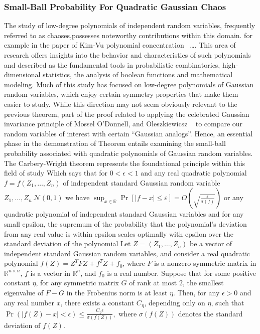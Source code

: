 \subsubsection{Small-Ball Probability For Quadratic Gaussian Chaos} 
The study of low-degree polynomials of independent random variables,
frequently referred to as chaoses,possesses noteworthy contributions within this domain.
for example in the paper of Kim-Vu polynomial concentration
~\cite{kim2000concentration}\dots. 
This area of research offers insights into the behavior and 
characteristics of such polynomials and described as the fundamental tools
in probabilistic combinatorics, high-dimensional statistics, the analysis
of boolean functions and mathematical modeling.
Much of this study has focused on low-degree polynomials of Gaussian random variables, which enjoy
certain symmetry properties that make them easier to study. While this direction may not seem obviously
relevant to the previous theorem,
part of the proof related to applying the celebrated 
Gaussian invariance principle of Mossel O'Donnell, and Oleszkiewicsz
~\cite{mossel2005noise}
to compare our random variables of interest with certain “Gaussian analogs”.
Hence, an essential phase in the demonstration of Theorem entails examining the small-ball
probability associated with quadratic polynomials of Gaussian random variables.
The Carbery-Wright theorem represents the foundational principle within this field of study
Which says that for $ 0 < \epsilon < 1 $ and any real quadratic polynomial $f=f(Z_1,\dots,Z_n)$ 
of independent standard Gaussian random variable $Z_1,\dots,Z_n ~ \mathcal{N}(0,1)$ 
we have $\sup_{x \in \mathbb{R}} \Pr[|f - x| \leq \varepsilon] = O\left(\sqrt{\frac{\varepsilon}{\sigma(f)}}\right)$
or any quadratic polynomial of 
independent standard Gaussian variables and for any small epsilon,
the supremum of the probability that the polynomial's
deviation from any real value is within epsilon scales optimally
with epsilon over the standard deviation of the polynomial
Let $Z = (Z_1, \ldots, Z_n)$ be a vector of independent standard Gaussian random variables,
and consider a real quadratic polynomial
$f(Z) = Z^T F Z + f^T Z + f_0$, where $F$ is a nonzero symmetric matrix in
$\mathbb{R}^{n \times n}$, $f$ is a vector in $\mathbb{R}^n$, and $f_0$ is a real number.
Suppose that for some positive constant $\eta$, for any symmetric matrix $G$ of rank at most $2$,
the smallest eigenvalue of $F - G$ in the Frobenius norm is at least $\eta$. Then, for any $\epsilon > 0$ 
and any real number $x$, there exists a constant $C_{\eta}$, depending only on $\eta$, such that
$
\Pr\left( |f(Z) - x| < \epsilon \right) \leq \frac{C_{\eta} \epsilon}{\sigma(f(Z))},
$
where $\sigma(f(Z))$ denotes the standard deviation of $f(Z)$.

